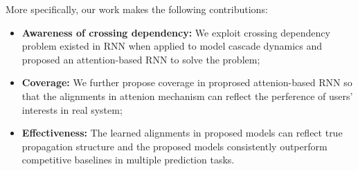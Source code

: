 More specifically, our work makes the following contributions:
\begin{itemize}
  \item \textbf{Awareness of crossing dependency:} We exploit crossing
  dependency problem existed in RNN when applied to
  model cascade dynamics and proposed an attention-based RNN to solve the
  problem;
  \item \textbf{Coverage:} We further propose coverage in
  proprosed attenion-based RNN so that the alignments in attenion mechanism can
  reflect the perference of users' interests in real system; 
  \item \textbf{Effectiveness:} The learned alignments in proposed models can
  reflect true propagation structure and the proposed models consistently
  outperform competitive baselines in multiple prediction tasks.
\end{itemize}
% 
% 

